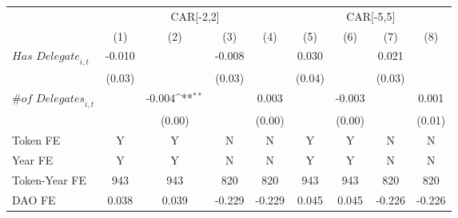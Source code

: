 {
\def\sym#1{\ifmmode^{#1}\else\(^{#1}\)\fi}
\begin{tabular}{l*{8}{c}}
\toprule
                    &\multicolumn{4}{c}{CAR[-2,2]}                                                          &\multicolumn{4}{c}{CAR[-5,5]}                                                          \\\cmidrule(lr){2-5}\cmidrule(lr){6-9}
                    &\multicolumn{1}{c}{(1)}         &\multicolumn{1}{c}{(2)}         &\multicolumn{1}{c}{(3)}         &\multicolumn{1}{c}{(4)}         &\multicolumn{1}{c}{(5)}         &\multicolumn{1}{c}{(6)}         &\multicolumn{1}{c}{(7)}         &\multicolumn{1}{c}{(8)}         \\
\midrule
$\textit{Has Delegate}_{i,t}$&      -0.010         &                     &      -0.008         &                     &       0.030         &                     &       0.021         &                     \\
                    &      (0.03)         &                     &      (0.03)         &                     &      (0.04)         &                     &      (0.03)         &                     \\
$\textit{\# of Delegates}_{i,t}$&                     &      -0.004\sym{**} &                     &       0.003         &                     &      -0.003         &                     &       0.001         \\
                    &                     &      (0.00)         &                     &      (0.00)         &                     &      (0.00)         &                     &      (0.01)         \\
\midrule
Token FE            &           Y         &           Y         &           N         &           N         &           Y         &           Y         &           N         &           N         \\
Year FE             &           Y         &           Y         &           N         &           N         &           Y         &           Y         &           N         &           N         \\
Token-Year FE       &         943         &         943         &         820         &         820         &         943         &         943         &         820         &         820         \\
DAO FE              &       0.038         &       0.039         &      -0.229         &      -0.229         &       0.045         &       0.045         &      -0.226         &      -0.226         \\
\bottomrule
\end{tabular}
}
